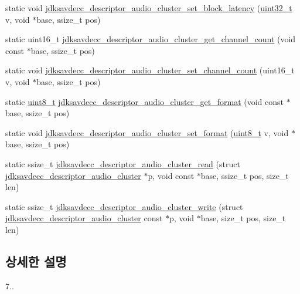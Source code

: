 \begin{DoxyCompactItemize}
\item 
static void \hyperlink{group__descriptor__audio__cluster_gaaf74c6f91f3808ce1ee102dd85379817}{jdksavdecc\+\_\+descriptor\+\_\+audio\+\_\+cluster\+\_\+set\+\_\+block\+\_\+latency} (\hyperlink{parse_8c_a6eb1e68cc391dd753bc8ce896dbb8315}{uint32\+\_\+t} v, void $\ast$base, ssize\+\_\+t pos)
\item 
static uint16\+\_\+t \hyperlink{group__descriptor__audio__cluster_gadc3bb7fe291e49fe10a988cf04fe54af}{jdksavdecc\+\_\+descriptor\+\_\+audio\+\_\+cluster\+\_\+get\+\_\+channel\+\_\+count} (void const $\ast$base, ssize\+\_\+t pos)
\item 
static void \hyperlink{group__descriptor__audio__cluster_ga1a067c8955dab9e6ee5528bc5803a773}{jdksavdecc\+\_\+descriptor\+\_\+audio\+\_\+cluster\+\_\+set\+\_\+channel\+\_\+count} (uint16\+\_\+t v, void $\ast$base, ssize\+\_\+t pos)
\item 
static \hyperlink{stdint_8h_aba7bc1797add20fe3efdf37ced1182c5}{uint8\+\_\+t} \hyperlink{group__descriptor__audio__cluster_gaae354012aa1d2bba4c18044bbd6e55ea}{jdksavdecc\+\_\+descriptor\+\_\+audio\+\_\+cluster\+\_\+get\+\_\+format} (void const $\ast$base, ssize\+\_\+t pos)
\item 
static void \hyperlink{group__descriptor__audio__cluster_gaefa0fcca47ea30bba3dc0a40561f93fe}{jdksavdecc\+\_\+descriptor\+\_\+audio\+\_\+cluster\+\_\+set\+\_\+format} (\hyperlink{stdint_8h_aba7bc1797add20fe3efdf37ced1182c5}{uint8\+\_\+t} v, void $\ast$base, ssize\+\_\+t pos)
\item 
static ssize\+\_\+t \hyperlink{group__descriptor__audio__cluster_ga152f8e529f7032886ba85998e010ed86}{jdksavdecc\+\_\+descriptor\+\_\+audio\+\_\+cluster\+\_\+read} (struct \hyperlink{structjdksavdecc__descriptor__audio__cluster}{jdksavdecc\+\_\+descriptor\+\_\+audio\+\_\+cluster} $\ast$p, void const $\ast$base, ssize\+\_\+t pos, size\+\_\+t len)
\item 
static ssize\+\_\+t \hyperlink{group__descriptor__audio__cluster_gae7c9d8c6719ffef0a968e0e175997687}{jdksavdecc\+\_\+descriptor\+\_\+audio\+\_\+cluster\+\_\+write} (struct \hyperlink{structjdksavdecc__descriptor__audio__cluster}{jdksavdecc\+\_\+descriptor\+\_\+audio\+\_\+cluster} const $\ast$p, void $\ast$base, size\+\_\+t pos, size\+\_\+t len)
\end{DoxyCompactItemize}


\subsection{상세한 설명}
7.. 

